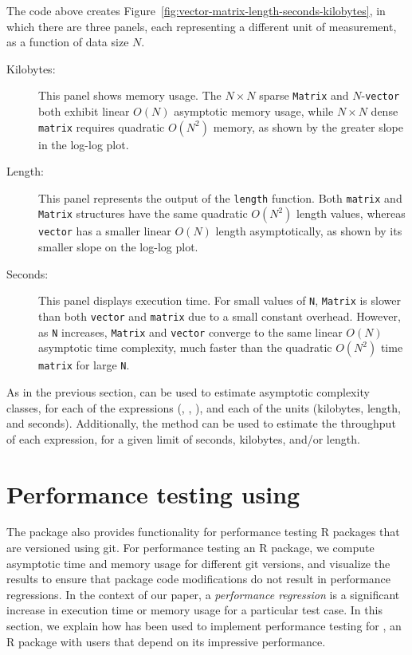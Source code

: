 The code above creates Figure~\ref{fig:vector-matrix-length-seconds-kilobytes}, in which there are three panels, each representing a different unit of measurement, as a function of data size $N$.
\begin{description}
\item[Kilobytes:] This panel shows memory usage. 
The $N\times N$ sparse \texttt{Matrix} and $N$-\texttt{vector} both exhibit linear $O(N)$ asymptotic memory usage, while $N\times N$ dense \texttt{matrix} requires quadratic $O(N^2)$ memory, as shown by the greater slope in the log-log plot.
\item[Length:] This panel represents the output of the \texttt{length} function. 
Both \texttt{matrix} and \texttt{Matrix} structures have the same quadratic $O(N^2)$ length values, whereas \texttt{vector} has a smaller linear $O(N)$ length asymptotically, as shown by its smaller slope on the log-log plot.
\item[Seconds:] This panel displays execution time. 
For small values of \texttt{N}, \texttt{Matrix} is slower than both \texttt{vector} and \texttt{matrix} due to a small constant overhead. However, as \texttt{N} increases, \texttt{Matrix} and \texttt{vector} converge to the same linear $O(N)$ asymptotic time complexity, much faster than the quadratic $O(N^2)$ time \texttt{matrix} for large \texttt{N}.
\end{description}
As in the previous section,  can be used to estimate asymptotic complexity classes, for each of the expressions (, , ), and each of the units (kilobytes, length, and seconds). 
Additionally, the  method can be used to estimate the throughput of each expression, for a given limit of seconds, kilobytes, and/or length. 

\section{Performance testing using }

The  package also provides functionality for performance testing R packages that are versioned using git. 
For performance testing an R package, we compute asymptotic time and memory usage for different git versions, and visualize the results to ensure that package code modifications do not result in performance regressions. 
In the context of our paper, a \textit{performance regression} is a significant increase in execution time or memory usage for a particular test case.
In this section, we explain how  has been used to implement performance testing for , an R package with users that depend on its impressive performance.

